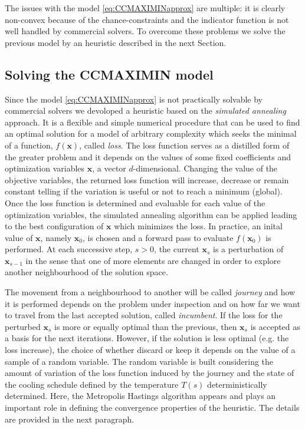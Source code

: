 The issues with the model \eqref{eq:CCMAXIMINapprox} are multiple: it is clearly non-convex because of the chance-constraints \parencite[see][for the demonstrations]{rockafellar2000optimization,rockafellar2001uryasev} and the indicator function is not well handled by commercial solvers.
To overcome these problems we solve the previous model by an heuristic described in the next Section.

\subsection{Solving the CCMAXIMIN model}\label{sec:heur}
Since the model \eqref{eq:CCMAXIMINapprox} is not practically solvable by commercial solvers we devoloped a heuristic based on the \emph{simulated annealing} approach. It is a flexible and simple numerical procedure that can be used to find an optimal solution for a model of arbitrary complexity which seeks the minimal of a function, $f(\mathbf{x})$, called \emph{loss}. The loss function serves as a distilled form of the greater problem and it depends on the values of some fixed coefficients and optimization variables $\mathbf{x}$, a vector $d$-dimensional. Changing the value of the objective variables, the returned loss function will increase, decrease or remain constant telling if the variation is useful or not to reach a minimum (global). Once the loss function is determined and evaluable for each value of the optimization variables, the simulated annealing algorithm can be applied leading to the best configuration of $\mathbf{x}$ which minimizes the loss. In practice, an inital value of $\mathbf{x}$, namely $\mathbf{x}_0$, is chosen and a forward pass to evaluate $f(\mathbf{x}_0)$ is performed. At each successive step, $s>0$, the current $\mathbf{x}_s$ is a perturbation of $\mathbf{x}_{s-1}$ in the sense that one of more elements are changed in order to explore another neighbourhood of the solution space.

The movement from a neighbourhood to another will be called \emph{journey} and how it is performed depends on the problem under inspection and on how far we want to travel from the last accepted solution, called \emph{incumbent}. If the loss for the perturbed $\mathbf{x}_s$ is more or equally optimal than the previous, then $\mathbf{x}_s$ is accepted as a basis for the next iterations. However, if the solution is less optimal (e.g. the loss increase), the choice of whether discard or keep it depends on the value of a sample of a random variable. The random variable is built considering the amount of variation of the loss function induced by the journey and the state of the cooling schedule defined by the temperature $T(s)$ deterministically determined. Here, the Metropolis Hastings algorithm appears and plays an important role in defining the convergence properties of the heuristic. The details are provided in the next paragraph.

